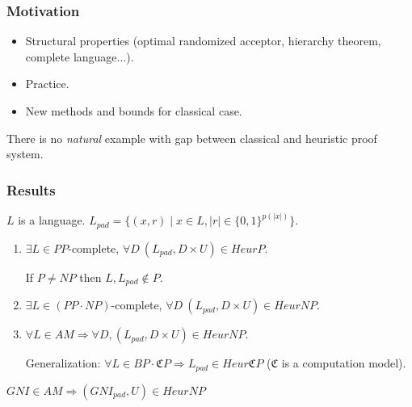 \begin{frame}
    \frametitle{Motivation}

    \pause
    \begin{itemize}
	    \item Structural properties (optimal randomized acceptor,
		    hierarchy theorem, complete language...).
        \pause
    	\item Practice.
    	\pause
        \item New methods and bounds for classical case.
    \end{itemize}

    \begin{statement}
        There is no {\it natural} example with gap between classical and heuristic proof system.
    \end{statement}
\end{frame}

\begin{frame}
    \frametitle{Results}

    $L$ is a language.
    $L_{pad} = \{(x, r) \mid x \in L, |r| \in \{0, 1 \}^{p(|x|)}\}$.
    
    \pause
    \begin{enumerate}
		\item $\exists L \in PP$-complete, $\forall D~
    		(L_{pad}, D \times U) \in HeurP$.

            \pause
            If $P \neq NP$ then $L, L_{pad} \notin P$.
    	\pause
    	\item $\exists L \in (PP \cdot NP)$-complete, $\forall D~
		    (L_{pad}, D \times U) \in HeurNP$.

    	\pause
    	\item $\forall L \in AM \Rightarrow \forall D,
    		(L_{pad}, D \times U) \in HeurNP$.

            \pause
            
            \vspace{0.5cm}
            Generalization:
		    $\forall L \in BP \cdot \mathfrak{C}P \Rightarrow L_{pad}
            \in Heur\mathfrak{C}P$ ($\mathfrak{C}$ is a computation
            model).    
    \end{enumerate}

    \pause
    \begin{example}
        $GNI \in AM \Rightarrow (GNI_{pad}, U) \in HeurNP$
    \end{example}
\end{frame}

